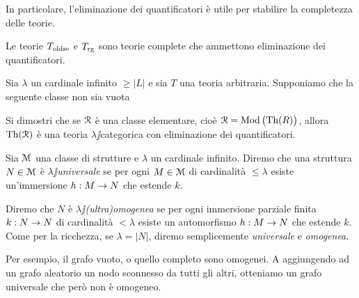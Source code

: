 In particolare, l'eliminazione dei quantificatori \`e utile per stabilire la completezza delle teorie.

\begin{corollary}\label{elimquanToldseTrg}
Le teorie  $T_{\rm oldse}$  e $T_{\rm rg}$ sono teorie complete che ammettono eliminazione dei quantificatori.\QED
\end{corollary}


\begin{exercise}\label{ex_R=Mod(Th(R))}
Sia $\lambda$ un cardinale infinito $\ge|L|$ e sia $T$ una teoria arbitraria. Supponiamo che la seguente classe non sia vuota 


Si dimostri che se $\EuScript R$ \`e una classe elementare, cio\`e $\EuScript R=\mathop\textrm{Mod}\big(\textrm{Th}(R)\big)$, allora $\textrm{Th}(\EuScript R)$ \`e una teoria $\lambda\jj$categorica con eliminazione dei quantificatori.\QED 
\end{exercise}

\begin{definition}\label{def_omogenea_universale}
Sia $\EuScript M$ una classe di strutture e $\lambda$ un cardinale infinito. Diremo che una struttura $N\in\EuScript M$ \`e \emph{$\lambda\jj$universale\/} se per ogni $M\in\EuScript M$ di cardinalit\`a $\le\lambda$ esiste un'immersione $h:M\rightarrow N$ che estende $k$. 

Diremo che $N$ \`e \emph{$\lambda\jj$(ultra)omogenea\/} se per ogni immersione parziale finita $k:N\rightarrow N$ di cardinalit\`a $<\lambda$ esiste un automorfismo $h:M\rightarrow N$ che estende $k$. Come per la ricchezza, se $\lambda=|N|$, diremo semplicemente \emph{universale\/} e \emph{omogenea}.
\end{definition}

Per esempio, il grafo vuoto, o quello completo sono omogenei. A aggiungendo ad un grafo aleatorio un nodo sconnesso da tutti gli altri, otteniamo un grafo universale che per\`o non \`e omogeneo.


